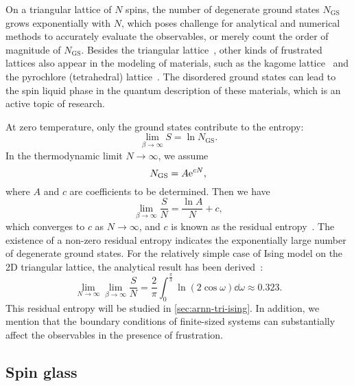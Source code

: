 On a triangular lattice of $N$ spins, the number of degenerate ground states $N_\text{GS}$ grows exponentially with $N$, which poses challenge for analytical and numerical methods to accurately evaluate the observables, or merely count the order of magnitude of $N_\text{GS}$. Besides the triangular lattice~\cite{liu2020intrinsic}, other kinds of frustrated lattices also appear in the modeling of materials, such as the kagome lattice~\cite{wolf1988ising} and the pyrochlore (tetrahedral) lattice~\cite{siddharthan1999ising}. The disordered ground states can lead to the spin liquid phase in the quantum description of these materials, which is an active topic of research.

At zero temperature, only the ground states contribute to the entropy:
\begin{equation}
\lim_{\beta \to \infty} S = \ln N_\text{GS}.
\end{equation}
In the thermodynamic limit $N \to \infty$, we assume
\begin{equation}
N_\text{GS} = A \mathrm{e}^{c N},
\end{equation}
where $A$ and $c$ are coefficients to be determined. Then we have
\begin{equation}
\lim_{\beta \to \infty} \frac{S}{N} = \frac{\ln A}{N} + c,
\end{equation}
which converges to $c$ as $N \to \infty$, and $c$ is known as the residual entropy~\cite{wannier1950antiferromagnetism, mambrini1999residual, vanderstraeten2018residual}. The existence of a non-zero residual entropy indicates the exponentially large number of degenerate ground states. For the relatively simple case of Ising model on the 2D triangular lattice, the analytical result has been derived~\cite{wannier1950antiferromagnetism, wannier1973antiferromagnetism, houtappel1950order}:
\begin{equation}
\lim_{N \to \infty} \lim_{\beta \to \infty} \frac{S}{N} = \frac{2}{\pi} \int_0^{\frac{\pi}{3}} \ln(2 \cos \omega) \dd \omega \approx 0.323.
\end{equation}
This residual entropy will be studied in \cref{sec:arnn-tri-ising}. In addition, we mention that the boundary conditions of finite-sized systems can substantially affect the observables in the presence of frustration.

\subsection{Spin glass}
\label{sec:random-interactions}
\label{sec:ea}
\label{sec:sk}

